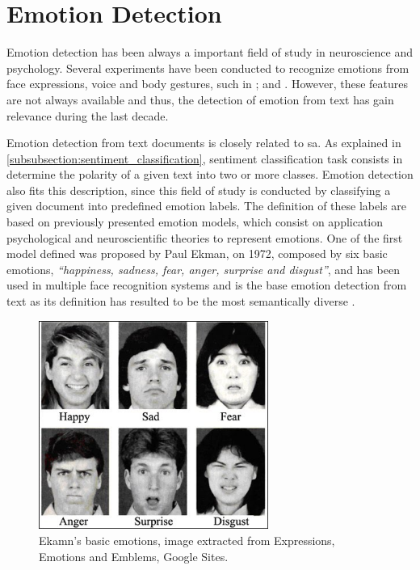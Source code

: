 
\section{Emotion Detection}
\label{sec:emotion_detection}

Emotion detection has been always a important field of study in neuroscience and psychology. Several experiments have been conducted to recognize emotions from face expressions, voice and body gestures, such in \cite{bassili1979emotion}; \cite{banziger2009emotion} and \cite{gunes2007bi}. However, these features are not always available and thus, the detection of emotion from text has gain relevance during the last decade.

Emotion detection from text documents is closely related to \acrshort{sa}. As explained in \ref{subsubsection:sentiment_classification}, sentiment classification task consists in determine the polarity of a given text into two or more classes. Emotion detection also fits this description, since this field of study is conducted by classifying a given document into predefined emotion labels. The definition of these labels are based on previously presented emotion models, which consist on application psychological and neuroscientific theories to represent emotions. One of the first model defined was proposed by Paul Ekman, on 1972, composed by six basic emotions, \textit{``happiness, sadness, fear, anger, surprise and disgust''}, and has been used in multiple face recognition systems and is the base emotion detection from text \cite{StevenEmotion2011Classification} as its definition has resulted to be the most semantically diverse \cite{bann2013conceptualisation}.

\begin{figure}[!htp]
  \center
  \includegraphics[width=0.67\textwidth]{figures/emotions_ekman}
  \caption{Ekamn's basic emotions, image extracted from Expressions, Emotions and Emblems, Google Sites.}
  \label{fig:ekman_basic_emotions}
\end{figure}


